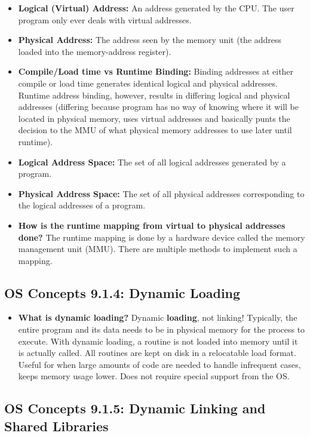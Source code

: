 \documentclass[12pt]{article}
\begin{document}
\begin{itemize}
    \item \textbf{Logical (Virtual) Address:} An address generated by the CPU. The user program only ever deals with virtual addresses.
    \item \textbf{Physical Address:} The address seen by the memory unit (the address loaded into the memory-address register).
    \item \textbf{Compile/Load time vs Runtime Binding:} Binding addresses at either compile or load time generates identical logical and physical addresses. Runtime address binding, however, results in differing logical and physical addresses (differing because program has no way of knowing where it will be located in physical memory, uses virtual addresses and basically punts the decision to the MMU of what physical memory addresses to use later until runtime).
    \item \textbf{Logical Address Space:} The set of all logical addresses generated by a program.
    \item \textbf{Physical Address Space:} The set of all physical addresses corresponding to the logical addresses of a program.
    \item \textbf{How is the runtime mapping from virtual to physical addresses done?} The runtime mapping is done by a hardware device called the memory management unit (MMU). There are multiple methods to implement such a mapping.
\end{itemize}

\subsection*{OS Concepts 9.1.4: Dynamic Loading}

\begin{itemize}
    \item \textbf{What is dynamic loading?} Dynamic \textbf{loading}, not linking! Typically, the entire program and its data needs to be in physical memory for the process to execute. With dynamic loading, a routine is not loaded into memory until it is actually called. All routines are kept on disk in a relocatable load format. Useful for when large amounts of code are needed to handle infrequent cases, keeps memory usage lower. Does not require special support from the OS.
\end{itemize}

\subsection*{OS Concepts 9.1.5: Dynamic Linking and Shared Libraries}
\end{document}
